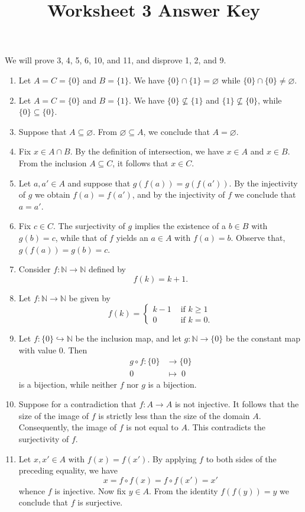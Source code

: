 \documentclass{article}
\title{Worksheet 3 Answer Key}
\author{}\date{}
\newcommand{\N}{\mathbb{N}}
\renewcommand{\emptyset}{\varnothing}
\renewcommand{\subset}{\subseteq}
\begin{document}
\maketitle

\noindent
We will prove 3, 4, 5, 6, 10, and 11, and disprove 1, 2, and 9.

\begin{enumerate}
	\item Let $A=C=\{0\}$ and $B=\{1\}$. We have $\{0\}\cap\{1\}=\emptyset$ while $\{0\}\cap\{0\}\neq\emptyset$.
	\item Let $A=C=\{0\}$ and $B=\{1\}$. We have $\{0\}\not\subset\{1\}$ and $\{1\}\not\subset\{0\}$, while $\{0\}\subset\{0\}$.
	\item Suppose that $A\subset\emptyset$. From $\emptyset\subset A$, we conclude that $A=\emptyset$.
	\item Fix $x\in A\cap B$. By the definition of intersection, we have $x\in A$ and $x\in B$. From the inclusion $A\subset C$, it follows that $x\in C$.
	\item Let $a,a'\in A$ and suppose that $g(f(a)) = g(f(a'))$. By the injectivity of $g$ we obtain $f(a)=f(a')$, and by the injectivity of $f$ we conclude that $a=a'$.
	\item Fix $c\in C$. The surjectivity of $g$ implies the existence of a $b\in B$ with $g(b)=c$, while that of $f$ yields an $a\in A$ with $f(a)=b$. Observe that, $g(f(a))=g(b)=c$.
	\item Consider $f:\N\to\N$ defined by
		\[
			f(k) = k+1.
		\]
	\item Let $f:\N\to\N$ be given by
		\[
			f(k) =
				\begin{cases}
					k-1	&\text{ if }k\geq 1	\\
					0	&\text{ if }k=0.
				\end{cases}
		\]
	\item Let $f:\{0\}\hookrightarrow\N$ be the inclusion map, and let $g:\N\to\{0\}$ be the constant map with value $0$. Then
		\begin{align*}
			g\circ f:	\{0\}	&\to		\{0\}		\\
					0\;	&\mapsto	\;0
		\end{align*}
		is a bijection, while neither $f$ nor $g$ is a bijection.
	\item Suppose for a contradiction that $f:A\to A$ is not injective. It follows that the size of the image of $f$ is strictly less than the size of the domain $A$. Consequently, the image of $f$ is not equal to $A$. This contradicts the surjectivity of $f$.
	\item Let $x,x'\in A$ with $f(x)=f(x')$. By applying $f$ to both sides of the preceding equality, we have
		\[
			x = f\circ f(x) = f\circ f(x') = x'
		\]
		whence $f$ is injective. Now fix $y\in A$. From the identity $f(f(y)) = y$ we conclude that $f$ is surjective.
\end{enumerate}
\end{document}
